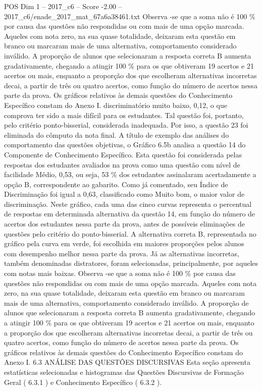 \begin{textsample}{POS Dim 1 – 2017\_c6 – Score -2.00 – 2017\_c6/enade\_2017\_mat\_67a6a38461.txt}
Observa -se que a soma não é 100 \% por causa das questões não respondidas ou com mais de uma opção marcada.
Aqueles com nota zero, na sua quase totalidade, deixaram esta questão em branco ou marcaram mais de uma alternativa, comportamento considerado inválido.
A proporção de alunos que selecionaram a resposta correta B aumenta gradativamente, chegando a atingir 100 \% para os que obtiveram 19 acertos e 21 acertos ou mais, enquanto a proporção dos que escolheram alternativas incorretas decai, a partir de três ou quatro acertos, como função do número de acertos nessa parte da prova.
Os gráficos relativos às demais questões do Conhecimento Específico constam do Anexo I. discriminatório muito baixo, 0,12, o que comprova ter sido a mais difícil para os estudantes.
Tal questão foi, portanto, pelo critério ponto-bisserial, considerada inadequada.
Por isso, a questão 23 foi eliminada do cômputo da nota final.
A título de exemplo das análises do comportamento das questões objetivas, o Gráfico 6.5b analisa a questão 14 do Componente de Conhecimento Específico.
Esta questão foi considerada pelas respostas dos estudantes avaliados na prova como uma questão com nível de facilidade Médio, 0,53, ou seja, 53 \% dos estudantes assinalaram acertadamente a opção B, correspondente ao gabarito.
Como já comentado, seu Índice de Discriminação foi igual a 0,63, classificado como Muito bom, o maior valor de discriminação.
Neste gráfico, cada uma das cinco curvas representa o percentual de respostas em determinada alternativa da questão 14, em função do número de acertos dos estudantes nessa parte da prova, antes de possíveis eliminações de questões pelo critério do ponto-bisserial.
A alternativa correta B, representada no gráfico pela curva em verde, foi escolhida em maiores proporções pelos alunos com desempenho melhor nessa parte da prova.
Já as alternativas incorretas, também denominadas distratores, foram selecionadas, principalmente, por aqueles com notas mais baixas.
Observa -se que a soma não é 100 \% por causa das questões não respondidas ou com mais de uma opção marcada.
Aqueles com nota zero, na sua quase totalidade, deixaram esta questão em branco ou marcaram mais de uma alternativa, comportamento considerado inválido.
A proporção de alunos que selecionaram a resposta correta B aumenta gradativamente, chegando a atingir 100 \% para os que obtiveram 19 acertos e 21 acertos ou mais, enquanto a proporção dos que escolheram alternativas incorretas decai, a partir de três ou quatro acertos, como função do número de acertos nessa parte da prova.
Os gráficos relativos às demais questões do Conhecimento Específico constam do Anexo I. 6.3 ANÁLISE DAS QUESTÕES DISCURSIVAS Esta seção apresenta estatísticas selecionadas e histogramas das Questões Discursivas de Formação Geral ( 6.3.1 ) e Conhecimento Específico ( 6.3.2 ).

\end{textsample}

